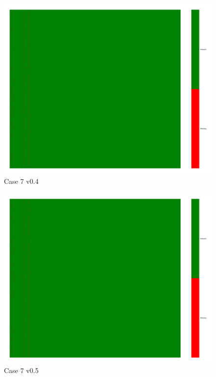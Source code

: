 \documentclass[a4paper,12pt]{article}
\begin{document}
\begin{figure}[H]
    \includegraphics[width=\linewidth]{case8_v0.4_heatmap_cleaned.png}
    \caption*{Case 7 v0.4}
\end{figure}

\begin{figure}[H]
    \includegraphics[width=\linewidth]{case8_v0.5_heatmap_cleaned.png}
    \caption*{Case 7 v0.5}
\end{figure}
\end{document}
